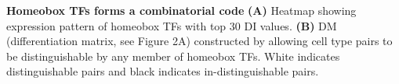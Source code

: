 \textbf{Homeobox TFs forms a combinatorial code} 
\textbf{(A)} Heatmap showing expression pattern of homeobox TFs with top 30 DI values. \textbf{(B)} DM (differentiation matrix, see Figure 2A) constructed by allowing cell type pairs to be distinguishable by any member of homeobox TFs. White indicates distinguishable pairs and black indicates in-distinguishable pairs. 
